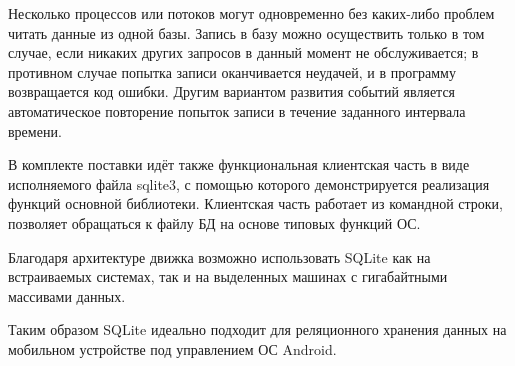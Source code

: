 Несколько процессов или потоков могут одновременно без каких-либо проблем читать данные из одной базы. Запись в базу можно осуществить только в том случае, если никаких других запросов в данный момент не обслуживается; в противном случае попытка записи оканчивается неудачей, и в программу возвращается код ошибки. Другим вариантом развития событий является автоматическое повторение попыток записи в течение заданного интервала времени.

В комплекте поставки идёт также функциональная клиентская часть в виде исполняемого файла sqlite3, с помощью которого демонстрируется реализация функций основной библиотеки. Клиентская часть работает из командной строки, позволяет обращаться к файлу БД на основе типовых функций ОС.

Благодаря архитектуре движка возможно использовать SQLite как на встраиваемых системах, так и на выделенных машинах с гигабайтными массивами данных.

Таким образом SQLite идеально подходит для реляционного хранения данных на мобильном устройстве под управлением ОС Android.


